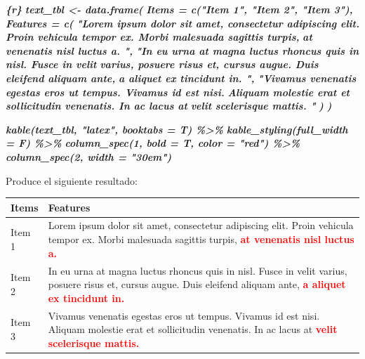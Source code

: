 \documentclass[12pt,a4paper,]{book}
\newenvironment{Shaded}{\begin{snugshade}}{\end{snugshade}}
\newcommand{\InformationTok}[1]{\textcolor[rgb]{0.56,0.35,0.01}{\textbf{\textit{#1}}}}
\numberwithin{dummy}{section}
\theoremstyle{ocrenumbox}
\theoremstyle{blacknumex}
\theoremstyle{blacknumbox}
\theoremstyle{ocrenum}
\theoremstyle{ocrenum}
\begin{document}
\begin{Shaded}
\begin{Highlighting}[]
\InformationTok{\textasciigrave{}\textasciigrave{}\textasciigrave{}\{r\}}
\InformationTok{text\_tbl \textless{}{-} data.frame(}
\InformationTok{  Items = c("Item 1", "Item 2", "Item 3"), }
\InformationTok{  Features = c(}
\InformationTok{    "Lorem ipsum dolor sit amet, consectetur adipiscing elit.}
\InformationTok{    Proin vehicula tempor ex. Morbi malesuada sagittis turpis,}
\InformationTok{    at venenatis nisl luctus a. ",}
\InformationTok{    "In eu urna at magna luctus rhoncus quis in nisl. Fusce in velit}
\InformationTok{    varius, posuere risus et, cursus augue. Duis eleifend aliquam ante,}
\InformationTok{    a aliquet ex tincidunt in. ",}
\InformationTok{    "Vivamus venenatis egestas eros ut tempus. Vivamus id est nisi.}
\InformationTok{    Aliquam molestie erat et sollicitudin venenatis. In ac lacus at}
\InformationTok{    velit scelerisque mattis. "}
\InformationTok{    ) }
\InformationTok{  )}

\InformationTok{kable(text\_tbl, "latex", booktabs = T) \%\textgreater{}\% }
\InformationTok{  kable\_styling(full\_width = F) \%\textgreater{}\% }
\InformationTok{  column\_spec(1, bold = T, color = "red") \%\textgreater{}\% }
\InformationTok{  column\_spec(2, width = "30em")}
\InformationTok{\textasciigrave{}\textasciigrave{}\textasciigrave{}}
\end{Highlighting}
\end{Shaded}

Produce el siguiente resultado:

\begin{table}
\centering
\begin{tabular}{>{}l>{\raggedright\arraybackslash}p{30em}}
\toprule
Items & Features\\
\midrule
Item 1 & Lorem ipsum dolor sit amet, consectetur adipiscing elit.
    Proin vehicula tempor ex. Morbi malesuada sagittis turpis,
\textcolor{red}{\textbf{    at venenatis nisl luctus a.}}\\
Item 2 & In eu urna at magna luctus rhoncus quis in nisl. Fusce in velit
    varius, posuere risus et, cursus augue. Duis eleifend aliquam ante,
\textcolor{red}{\textbf{    a aliquet ex tincidunt in.}}\\
Item 3 & Vivamus venenatis egestas eros ut tempus. Vivamus id est nisi.
    Aliquam molestie erat et sollicitudin venenatis. In ac lacus at
\textcolor{red}{\textbf{    velit scelerisque mattis.}}\\
\bottomrule
\end{tabular}
\end{table}
\end{document}
